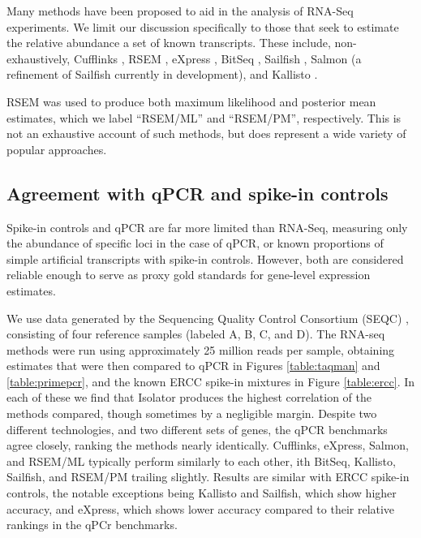\documentclass[twocolumn]{article}
\begin{document}
Many methods have been proposed to aid in the analysis of RNA-Seq
experiments. We limit our discussion specifically to those that seek to
estimate the relative abundance a set of known transcripts. These
include, non-exhaustively, Cufflinks \cite{Trapnell:2010kd},
RSEM \cite{Li:2011cb},
eXpress \cite{Roberts:2012dh},
BitSeq \cite{Glaus:2012ek},
Sailfish \cite{Patro:2014jd},
Salmon (a refinement of Sailfish currently in development), and
Kallisto \cite{Bray:2015uj}.

RSEM was used to produce both maximum likelihood and posterior
mean estimates, which we label ``RSEM/ML'' and ``RSEM/PM'', respectively.
This is not an exhaustive account of such methods, but does represent a
wide variety of popular approaches.

\subsection{Agreement with qPCR and spike-in controls}

Spike-in controls and qPCR are far more limited than RNA-Seq, measuring
only the abundance of specific loci in the case of qPCR, or known
proportions of simple artificial transcripts with spike-in controls.
However, both are considered reliable enough to serve as proxy gold
standards for gene-level expression estimates.

We use data generated by the Sequencing Quality Control Consortium (SEQC)
\cite{Consortium:2014kc}, consisting of four reference samples (labeled A, B, C,
and D). The RNA-seq methods were run using approximately 25 million reads per
sample, obtaining estimates that were then compared to qPCR in Figures
\ref{table:taqman} and \ref{table:primepcr}, and the known ERCC spike-in
mixtures in Figure \ref{table:ercc}. In each of these we find that Isolator
produces the highest correlation of the methods compared, though sometimes by a
negligible margin. Despite two different technologies, and two different sets of
genes, the qPCR benchmarks agree closely, ranking the methods nearly
identically. Cufflinks, eXpress, Salmon, and RSEM/ML typically perform similarly
to each other, ith BitSeq, Kallisto, Sailfish, and RSEM/PM trailing slightly.
Results are similar with ERCC spike-in controls, the notable exceptions being
Kallisto and Sailfish, which show higher accuracy, and eXpress, which shows
lower accuracy compared to their relative rankings in the qPCr benchmarks.
\end{document}
